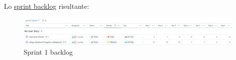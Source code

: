 Lo \href{https://github.com/orgs/ISIQuiz/projects/3/views/7}{sprint backlog} risultante:
\begin{figure}[H]
    \centering
    \includegraphics[width=\textwidth]{process/Img/Sprint1BL.jpg}
    \caption{Sprint 1 backlog}
    \label{fig:Sprint1}
\end{figure}

